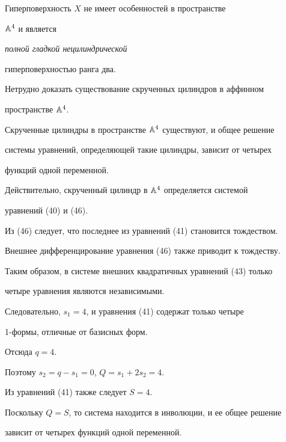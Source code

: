 Гиперповерхность $X$ не имеет особенностей в пространстве


${\Bbb A}^4$ и является {\em полной гладкой нецилиндрической


гиперповерхностью ранга два.}





Нетрудно доказать существование скрученных цилиндров в аффинном


пространстве ${\Bbb A}^4$.





\begin{thm}


Скрученные цилиндры в пространстве ${\Bbb A}^4$ существуют, и общее решение


системы уравнений, определяющей такие цилиндры, зависит от четырех


функций одной переменной.


\end{thm}





\begin{pf}


Действительно, скрученный цилиндр в ${\Bbb A}^4$ определяется системой


уравнений (40) и (46).


Из (46) следует, что последнее из уравнений (41) становится тождеством.


Внешнее дифференцирование уравнения  (46) также приводит к тождеству.


Таким образом, в системе внешних квадратичных уравнений (43) только


четыре уравнения являются независимыми.


Следовательно, $s_1 = 4$, и уравнения (41) содержат только четыре


1-формы, отличные от базисных форм.


Отсюда $q = 4$.


Поэтому $s_2 = q - s_1 = 0$, $Q = s_1 + 2 s_2 = 4$.


Из уравнений (41) также следует $S = 4$.


Поскольку $Q = S$, то система находится в инволюции, и ее общее решение


зависит от четырех функций одной переменной.


\end{pf}





